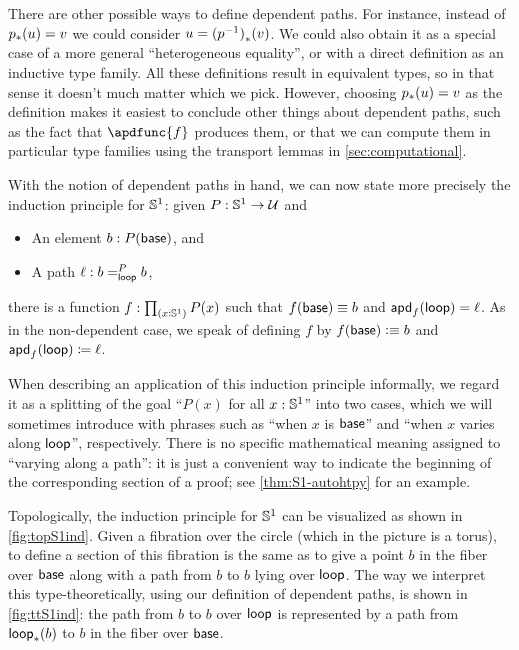\begin{rmk}
There are other possible ways to define dependent paths.
For instance, instead of $\trans p u = v$ we could consider $u = \trans{(\opp p)}{v}$.
We could also obtain it as a special case of a more general ``heterogeneous equality'',
%
%
or with a direct definition as an inductive type family.
All these definitions result in equivalent types, so in that sense it doesn't much matter which we pick.
However, choosing $\trans p u = v$ as the definition makes it easiest to conclude other things about dependent paths, such as the fact that $\apdfunc{f}$ produces them, or that we can compute them in particular type families using the transport lemmas in \autoref{sec:computational}.
\end{rmk}

With the notion of dependent paths in hand, we can now state more precisely the induction principle for $\Sn^1$: given $P:\Sn^1\to\type$ and
\begin{itemize}
\item An element $b:P(\base)$, and
\item A path $\ell : \dpath P \lloop b b$,
\end{itemize}
there is a function $f:\prd{x:\Sn^1} P(x)$ such that $f(\base)\jdeq b$ and $\apd f \lloop = \ell$.
As in the non-dependent case, we speak of defining $f$ by $f(\base)\defeq b$ and $\apd f \lloop \defid \ell$.

\begin{rmk}\label{rmk:varies-along}
  When describing an application of this induction principle informally, we regard it as a splitting of the goal ``$P(x)$ for all $x:\Sn^1$'' into two cases, which we will sometimes introduce with phrases such as ``when $x$ is $\base$'' and ``when $x$ varies along $\lloop$'', respectively.
  There is no specific mathematical meaning assigned to ``varying along a path'': it is just a convenient way to indicate the beginning of the corresponding section of a proof; see \autoref{thm:S1-autohtpy} for an example.
\end{rmk}

Topologically, the induction principle for $\Sn^1$ can be visualized as shown in \autoref{fig:topS1ind}.
Given a fibration over the circle (which in the picture is a torus), to define a section of this fibration is the same as to give a point $b$ in the fiber over $\base$ along with a path from $b$ to $b$ lying over $\lloop$.
The way we interpret this type-theoretically, using our definition of dependent paths, is shown in \autoref{fig:ttS1ind}: the path from $b$ to $b$ over $\lloop$ is represented by a path from $\trans \lloop b$ to $b$ in the fiber over $\base$.

